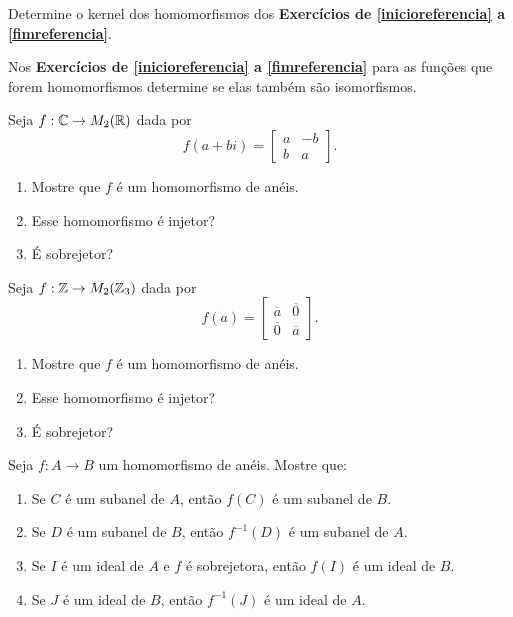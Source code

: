 \documentclass[12pt]{exam}
\begin{document}
\vspace{.3cm}

\questao{} Determine o kernel dos homomorfismos dos \textbf{Exercícios de \ref{inicioreferencia} a \ref{fimreferencia}}.

\vspace{.3cm}

\questao{} Nos \textbf{Exercícios de \ref{inicioreferencia} a \ref{fimreferencia}} para as funções que forem homomorfismos determine se elas também são isomorfismos.

\vspace{.3cm}

\questao{} Seja $f : \mathbb{C} \to M_2(\mathbb{R})$ dada por
\[
    f(a + bi) = \begin{bmatrix}
        a & -b\\
        b & a
    \end{bmatrix}.
\]
\begin{enumerate}[label=({\alph*})]
    \item Mostre que $f$ é um homomorfismo de anéis.

    \item Esse homomorfismo é injetor?

    \item É sobrejetor?
\end{enumerate}

\vspace{.3cm}

\questao{} Seja $f : \mathbb{Z} \to M_2(\mathbb{Z}_3)$ dada por
\[
    f(a) = \begin{bmatrix}
        \overline{a} & \overline{0}\\
        \overline{0} & \overline{a}
    \end{bmatrix}.
\]
\begin{enumerate}[label=({\alph*})]
    \item Mostre que $f$ é um homomorfismo de anéis.

    \item Esse homomorfismo é injetor?

    \item É sobrejetor?
\end{enumerate}

\vspace{.3cm}

\questao{} Seja $f: A \to B$ um homomorfismo de anéis. Mostre que:
\begin{enumerate}[label=({\alph*})]
    \item Se $C$  é um subanel de $A$, então $f(C)$ é um subanel de $B$.

    \item Se $D$ é um subanel de $B$, então $f^{-1}(D)$ é um subanel de $A$.

    \item Se $I$ é um ideal de $A$ e $f$ é sobrejetora, então $f(I)$ é um ideal de $B$.

    \item Se $J$ é um ideal de $B$, então $f^{-1}(J)$ é um ideal de $A$.
\end{enumerate}
\end{document}
